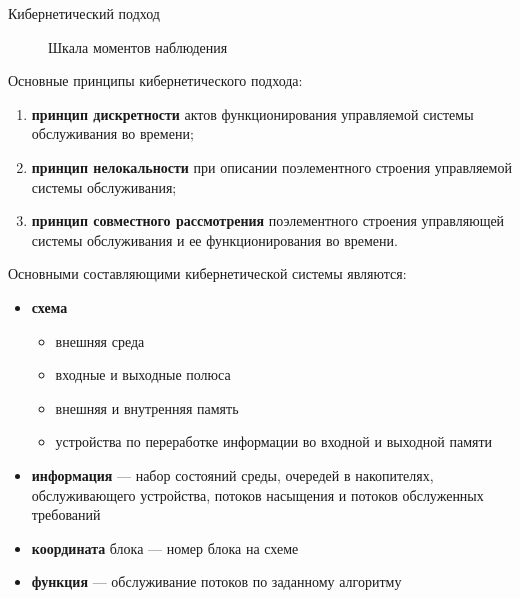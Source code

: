\documentclass[10pt]{beamer}
\begin{document}
\begin{frame}[allowframebreaks]{Кибернетический подход}
   \begin{figure}[h]
    \centering
    \caption{Шкала моментов наблюдения}
    \label{AZ:fig:3}
  \end{figure}
\framebreak
Основные принципы кибернетического подхода:
  \begin{enumerate}
  \item \textbf{принцип дискретности} актов функционирования управляемой
    системы обслуживания во времени;
  \item \textbf{принцип нелокальности} при описании поэлементного
    строения управляемой системы обслуживания;
  \item \textbf{принцип совместного
    рассмотрения} поэлементного строения управляющей системы
    обслуживания и ее функционирования во времени.
  \end{enumerate}
  \framebreak
Основными составляющими кибернетической системы являются:
  \begin{itemize}
  \item \textbf{схема}
  \begin{itemize}
      \item внешняя среда
      \item входные и выходные полюса
      \item внешняя и внутренняя память
      \item устройства по переработке информации во входной и выходной памяти
      \end{itemize}
  \item \textbf{информация} --- набор состояний среды, очередей в накопителях, обслуживающего устройства, потоков насыщения и потоков обслуженных требований
  \item \textbf{координата} блока --- номер блока на схеме
  \item \textbf{функция} --- обслуживание потоков по заданному алгоритму
  \end{itemize}

\end{frame}
\end{document}
